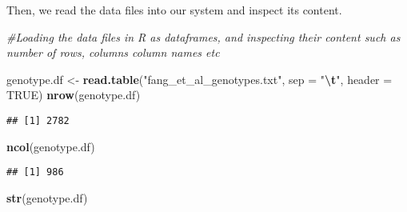 \documentclass[
]{article}
\newenvironment{Shaded}{\begin{snugshade}}{\end{snugshade}}
\newcommand{\AttributeTok}[1]{\textcolor[rgb]{0.13,0.29,0.53}{#1}}
\newcommand{\CommentTok}[1]{\textcolor[rgb]{0.56,0.35,0.01}{\textit{#1}}}
\newcommand{\ConstantTok}[1]{\textcolor[rgb]{0.56,0.35,0.01}{#1}}
\newcommand{\FunctionTok}[1]{\textcolor[rgb]{0.13,0.29,0.53}{\textbf{#1}}}
\newcommand{\NormalTok}[1]{#1}
\newcommand{\OtherTok}[1]{\textcolor[rgb]{0.56,0.35,0.01}{#1}}
\newcommand{\SpecialCharTok}[1]{\textcolor[rgb]{0.81,0.36,0.00}{\textbf{#1}}}
\newcommand{\StringTok}[1]{\textcolor[rgb]{0.31,0.60,0.02}{#1}}
\begin{document}
Then, we read the data files into our system and inspect its content.

\begin{Shaded}
\begin{Highlighting}[]
\CommentTok{\#Loading the data files in R as dataframes, and inspecting their content such as number of rows, columns column names etc}

\NormalTok{genotype.df }\OtherTok{\textless{}{-}} \FunctionTok{read.table}\NormalTok{(}\StringTok{"fang\_et\_al\_genotypes.txt"}\NormalTok{, }\AttributeTok{sep =} \StringTok{"}\SpecialCharTok{\textbackslash{}t}\StringTok{"}\NormalTok{, }\AttributeTok{header =} \ConstantTok{TRUE}\NormalTok{)}
\FunctionTok{nrow}\NormalTok{(genotype.df)}
\end{Highlighting}
\end{Shaded}

\begin{verbatim}
## [1] 2782
\end{verbatim}

\begin{Shaded}
\begin{Highlighting}[]
\FunctionTok{ncol}\NormalTok{(genotype.df)}
\end{Highlighting}
\end{Shaded}

\begin{verbatim}
## [1] 986
\end{verbatim}

\begin{Shaded}
\begin{Highlighting}[]
\FunctionTok{str}\NormalTok{(genotype.df)}
\end{Highlighting}
\end{Shaded}
\end{document}
